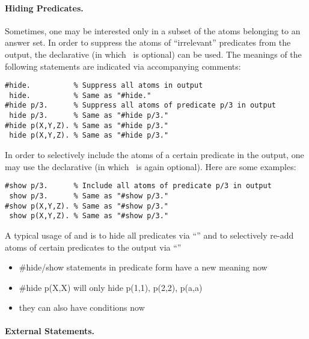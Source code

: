 \paragraph{Hiding Predicates.}
Sometimes, one may be interested only in a subset of the atoms belonging
to an answer set.
In order to suppress the atoms of ``irrelevant'' predicates from the output,
the  declarative (in which~\code{\#} is optional) can be used.
The meanings of the following statements are indicated via accompanying comments:
%
\begin{lstlisting}[numbers=none]
#hide.          % Suppress all atoms in output
 hide.          % Same as "#hide."
#hide p/3.      % Suppress all atoms of predicate p/3 in output
 hide p/3.      % Same as "#hide p/3."
#hide p(X,Y,Z). % Same as "#hide p/3."
 hide p(X,Y,Z). % Same as "#hide p/3."
\end{lstlisting}
%
In order to selectively include the atoms of a certain predicate in the output,
one may use the  declarative (in which~\code{\#} is again optional).
Here are some examples:
%
\begin{lstlisting}[numbers=none]
#show p/3.      % Include all atoms of predicate p/3 in output
 show p/3.      % Same as "#show p/3."
#show p(X,Y,Z). % Same as "#show p/3."
 show p(X,Y,Z). % Same as "#show p/3."
\end{lstlisting}
%
A typical usage of  and  is to hide all predicates
via ``'' and to selectively re-add atoms of certain predicates
 to the output via ``''

\begin{newstuff}
	\begin{itemize}
		\item \#hide/show statements in predicate form have a new meaning now
		\item \#hide p(X,X) will only hide p(1,1), p(2,2), p(a,a)
		\item they can also have conditions now
	\end{itemize}
\end{newstuff}

\begin{newstuff}
\paragraph{External Statements.}
\end{newstuff}

